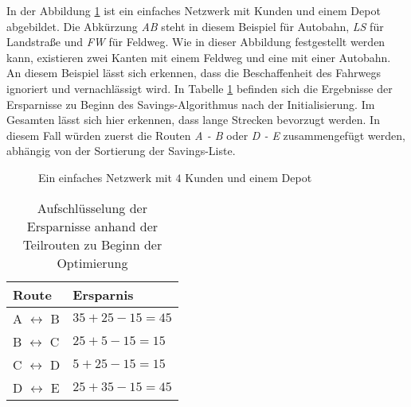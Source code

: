 \noindent
In der Abbildung \ref{fig:simpleNetwork} ist ein einfaches Netzwerk mit Kunden und einem Depot abgebildet. 
Die Abkürzung \textit{AB} steht in diesem Beispiel für Autobahn, \textit{LS} für Landstraße und \textit{FW} für Feldweg. 
Wie in dieser Abbildung festgestellt werden kann, existieren zwei Kanten mit einem Feldweg und eine mit einer Autobahn. 
An diesem Beispiel lässt sich erkennen, dass die Beschaffenheit des Fahrwegs ignoriert und vernachlässigt wird. 
In Tabelle \ref{tab:distSavings} befinden sich die Ergebnisse der Ersparnisse zu Beginn des Savings-Algorithmus nach der Initialisierung. 
Im Gesamten lässt sich hier erkennen, dass lange Strecken bevorzugt werden. 
In diesem Fall würden zuerst die Routen \textit{A - B} oder \textit{D - E} zusammengefügt werden, abhängig von der Sortierung der Savings-Liste. 
\begin{figure}
\centering
{}

	\caption{Ein einfaches Netzwerk mit $4$ Kunden und einem Depot}
	\label{fig:simpleNetwork}
\end{figure}
\begin{table}[htb]%
\centering%
\begin{tabular}{p{3cm}|p{4cm}}
Route & Ersparnis \\ 
\hline 
A $\leftrightarrow$ B & $35 + 25 - 15 = 45$ \\ 
B $\leftrightarrow$ C & $25 + 5 - 15 = 15$ \\ 
C $\leftrightarrow$ D & $5 + 25 - 15 = 15$ \\ 
D $\leftrightarrow$ E & $25 + 35 - 15 = 45$ \\ 
\end{tabular} 
\caption{Aufschlüsselung der Ersparnisse anhand der Teilrouten zu Beginn der Optimierung}
\label{tab:distSavings}
\end{table}

